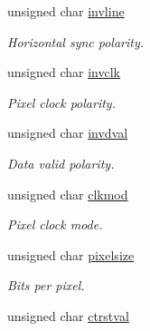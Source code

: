 \begin{CompactItemize}
unsigned char \hyperlink{structlcdc__configuration__s_6a43a0033a760ff44fff218c2c7e4fa6}{invline}
\begin{CompactList}\small\item\em Horizontal sync polarity. \item\end{CompactList}\item 
unsigned char \hyperlink{structlcdc__configuration__s_38bd4d20773d7477fd04f68a02564963}{invclk}
\begin{CompactList}\small\item\em Pixel clock polarity. \item\end{CompactList}\item 
unsigned char \hyperlink{structlcdc__configuration__s_911af56af449dcee1a610299619dd914}{invdval}
\begin{CompactList}\small\item\em Data valid polarity. \item\end{CompactList}\item 
unsigned char \hyperlink{structlcdc__configuration__s_399605434d25fa42df8f7d5142a93b9e}{clkmod}
\begin{CompactList}\small\item\em Pixel clock mode. \item\end{CompactList}\item 
unsigned char \hyperlink{structlcdc__configuration__s_3725097d44bfecb6396b9143ac302f24}{pixelsize}
\begin{CompactList}\small\item\em Bits per pixel. \item\end{CompactList}\item 
\hypertarget{structlcdc__configuration__s_63e7bb2ad3e2a853d47e495a78d87d49}{
unsigned char \hyperlink{structlcdc__configuration__s_63e7bb2ad3e2a853d47e495a78d87d49}{ctrstval}}
\label{structlcdc__configuration__s_63e7bb2ad3e2a853d47e495a78d87d49}


\end{CompactItemize}
